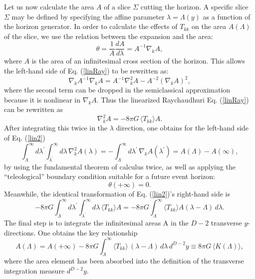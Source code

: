 \documentclass{article}
\begin{document}
Let us now calculate the area $A$ of a slice $\Sigma$ cutting the horizon.  A specific slice $\Sigma$ may be defined by specifying the affine parameter $\lambda = \Lambda(y)$ as a function of the horizon generator.  In order to calculate the effects of $T_{kk}$ on the area $A(\Lambda)$ of the slice, we use the relation between the expansion and the area:
\begin{equation}
\theta = \frac{1}{A}\frac{dA}{d\lambda} = A^{-1} \nabla_k A,
\end{equation}
where $A$ is the area of an infinitesimal cross section of the horizon.  This allows the left-hand side of Eq. (\ref{linRay}) to be rewritten as:
\begin{equation}
\nabla_k A^{-1} \nabla_k A = A^{-1} \nabla_k^2 A - A^{-2} (\nabla_k A)^2,
\end{equation}
where the second term can be dropped in the semiclassical approximation because it is nonlinear in $\nabla_k A$.  Thus the linearized Raychaudhuri Eq. (\ref{linRay}) can be rewritten as
\begin{equation}\label{lin2}
\nabla_k^2 A = -8\pi G\,\langle T_{kk} \rangle A.
\end{equation}
After integrating this twice in the $\lambda$ direction, one obtains for the left-hand side of Eq. (\ref{lin2})
\begin{equation}
\int_\Lambda^\infty d\lambda^\prime \int_{\lambda^\prime}^\infty d\lambda\,\nabla_k^2 A(\lambda) =
-\int_\Lambda^\infty d\lambda^\prime\,\nabla_k A(\lambda^\prime) =
A(\Lambda) - A(\infty),
\end{equation}
by using the fundamental theorem of calculus twice, as well as applying the ``teleological'' boundary condition suitable for a future event horizon:
\begin{equation}
\theta(+\infty) = 0.
\end{equation}
Meanwhile, the identical transformation of Eq. (\ref{lin2})'s right-hand side is
\begin{equation}
-8\pi G \int_\Lambda^\infty d\lambda^\prime \int_{\lambda^\prime}^\infty d\lambda\, \langle T_{kk} \rangle A =
-8\pi G \int_\Lambda^\infty \langle T_{kk} \rangle A (\lambda - \Lambda)\,d\lambda.
\end{equation}
The final step is to integrate the infinitesimal areas A in the $D - 2$ transverse $y$-directions.  One obtains the key relationship
\begin{equation}\label{Tint}
A(\Lambda) = A(+\infty)
- 8\pi G \int_\Lambda^\infty \langle T_{kk} \rangle \,(\lambda - \Lambda) \,d\lambda\,d^{D-2}y \equiv 8\pi G\, \langle K(\Lambda) \rangle,
\end{equation}
where the area element has been absorbed into the definition of the transverse integration measure $d^{D-2}y$.
\end{document}
